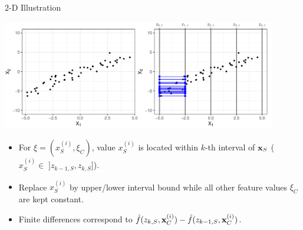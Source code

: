 \documentclass[11pt,compress,t,notes=noshow, aspectratio=169, xcolor=table]{beamer}
\begin{document}
\begin{frame}{2-D Illustration}
\centerline{\includegraphics[width=0.9\textwidth]{figure/ale_interval}}

 \begin{itemize}
  \item For $\xi = (x_S^{(i)}, \xi_C)$, value $x_S^{(i)}$ is located within $k$-th interval of $\xv_S$ ($x_S^{(i)} \in \; ]z_{k-1, S}, z_{k, S}]$).
  \item Replace $x_S^{(i)}$ by upper/lower interval bound while all other feature values $\xi_C$ are kept constant.
  \item Finite differences correspond to $\fh(z_{k, S}, \xi_C) - \fh(z_{k-1, S}, \xi_C)$. %
\end{itemize}

\end{frame}
\end{document}
